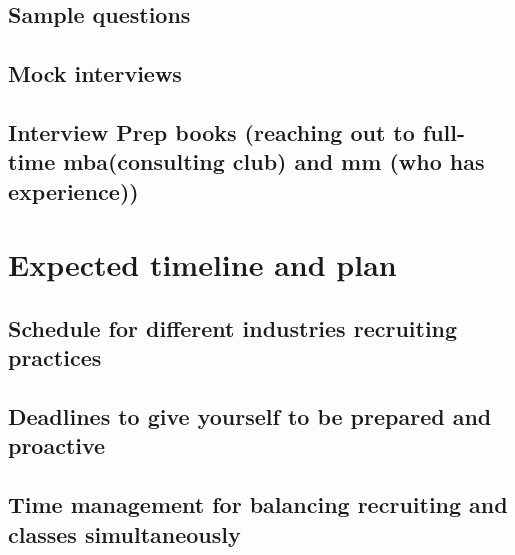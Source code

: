 \documentclass[
]{book}
\begin{document}
\hypertarget{sample-questions}{%
\subsection{Sample questions}\label{sample-questions}}

\hypertarget{mock-interviews}{%
\subsection{Mock interviews}\label{mock-interviews}}

\hypertarget{interview-prep-books-reaching-out-to-full-time-mbaconsulting-club-and-mm-who-has-experience}{%
\subsection{Interview Prep books (reaching out to full-time mba(consulting club) and mm (who has experience))}\label{interview-prep-books-reaching-out-to-full-time-mbaconsulting-club-and-mm-who-has-experience}}

\hypertarget{expected-timeline-and-plan}{%
\section{Expected timeline and plan}\label{expected-timeline-and-plan}}

\hypertarget{schedule-for-different-industries-recruiting-practices}{%
\subsection{Schedule for different industries recruiting practices}\label{schedule-for-different-industries-recruiting-practices}}

\hypertarget{deadlines-to-give-yourself-to-be-prepared-and-proactive}{%
\subsection{Deadlines to give yourself to be prepared and proactive}\label{deadlines-to-give-yourself-to-be-prepared-and-proactive}}

\hypertarget{time-management-for-balancing-recruiting-and-classes-simultaneously}{%
\subsection{Time management for balancing recruiting and classes simultaneously}\label{time-management-for-balancing-recruiting-and-classes-simultaneously}}

  
\end{document}
